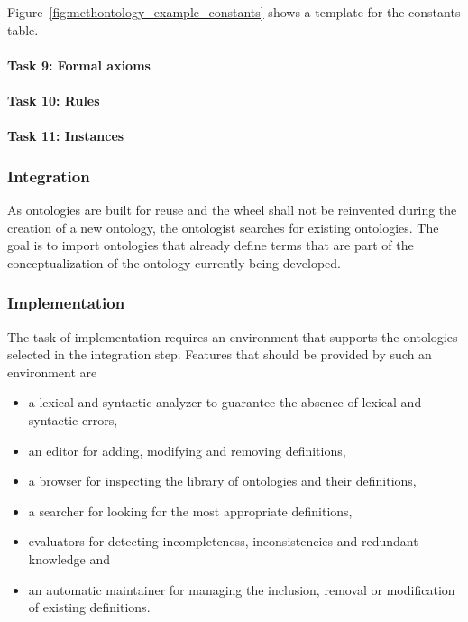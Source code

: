 Figure~\ref{fig:methontology_example_constants} shows a template for the constants table.

\paragraph{Task 9: Formal axioms}



\paragraph{Task 10: Rules}



\paragraph{Task 11: Instances}


\subsubsection{Integration}

As ontologies are built for reuse and the wheel shall not be reinvented during the creation of a new ontology, the ontologist searches for existing ontologies. The goal is to import ontologies that already define terms that are part of the conceptualization of the ontology currently being developed.

\subsubsection{Implementation}

The task of implementation requires an environment that supports the ontologies selected in the integration step. Features that should be provided by such an environment are

\begin{itemize}
  \item a lexical and syntactic analyzer to guarantee the absence of lexical and syntactic errors,
  \item an editor for adding, modifying and removing definitions,
  \item a browser for inspecting the library of ontologies and their definitions,
  \item a searcher for looking for the most appropriate definitions,
  \item evaluators for detecting incompleteness, inconsistencies and redundant knowledge and
  \item an automatic maintainer for managing the inclusion, removal or modification of existing definitions.
\end{itemize}

